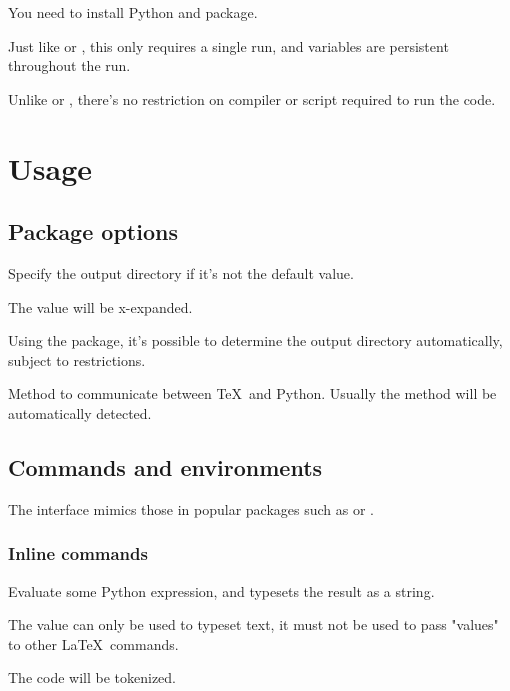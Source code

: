 
\newcommand\DescribeOption{\DescribeMacro}  %



You need to install Python  and  package.

Just like  or , this only requires a single run, and variables are persistent throughout the run.

Unlike  or , there's no restriction on compiler or script required to run the code.

\section{Usage}

\subsection{Package options}

\DescribeOption{outputdir=}

Specify the output directory if it's not the default value.

The value will be x-expanded.

Using the  package, it's possible to determine the output directory automatically, subject to restrictions.

\DescribeOption{mode=}

Method to communicate between \TeX\ and Python. Usually the method will be automatically detected.

\subsection{Commands and environments}

The interface mimics those in popular packages such as  or .

\subsubsection{Inline commands}

\DescribeMacro{\py}

Evaluate some Python expression, and typesets the result as a string.

The value can only be used to typeset text, it must not be used to pass "values" to other \LaTeX\ commands.

The code will be tokenized.

